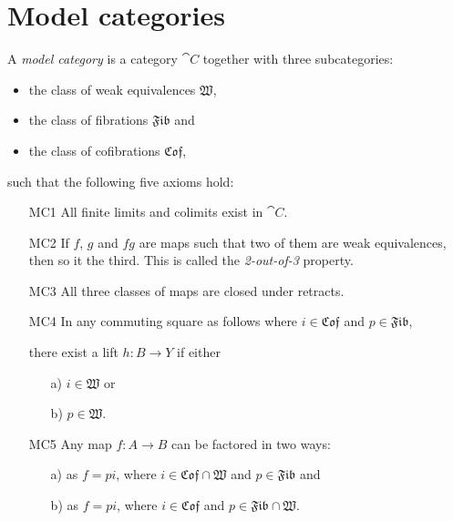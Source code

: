 
\section{Model categories}
\label{sec:model_cats}

\newcommand{\W}{\mathfrak{W}}
\newcommand{\Fib}{\mathfrak{Fib}}
\newcommand{\Cof}{\mathfrak{Cof}}

\begin{definition}
	A \emph{model category} is a category $\cat{C}$ together with three subcategories:
	\begin{itemize}
		\item the class of weak equivalences $\W$,
		\item the class of fibrations $\Fib$ and
		\item the class of cofibrations $\Cof$,
	\end{itemize}
	such that the following five axioms hold:
	\begin{itemize}
		\item[MC1] All finite limits and colimits exist in $\cat{C}$.
		\item[MC2] If $f$, $g$ and $fg$ are maps such that two of them are weak equivalences, then so it the third. This is called the \emph{2-out-of-3} property.
		\item[MC3] All three classes of maps are closed under retracts.
		\item[MC4] In any commuting square as follows where $i \in \Cof$ and $p \in \Fib$,
		\begin{center}
		\end{center}

		 there exist a lift $h: B \to Y$ if either 
		\begin{itemize}
			\item[a)] $i \in \W$ or
			\item[b)] $p \in \W$.
		\end{itemize}
		\item[MC5] Any map $f : A \to B$ can be factored in two ways:
		\begin{itemize}
			\item[a)] as $f = pi$, where $i \in \Cof \cap \W$ and $p \in \Fib$ and
			\item[b)] as $f = pi$, where $i \in \Cof$ and $p \in \Fib \cap \W$.
		\end{itemize}
	\end{itemize}
\end{definition}

